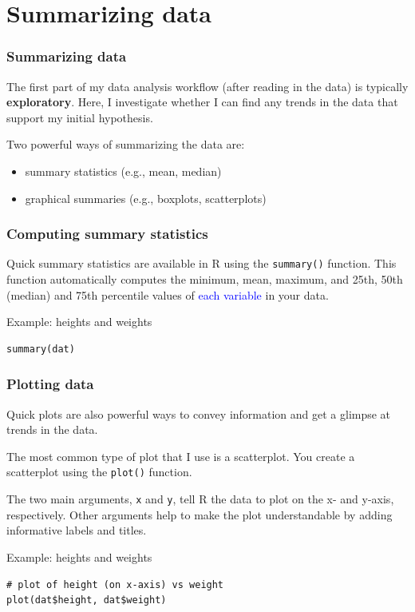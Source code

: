 \documentclass[11pt,dvipsnames]{beamer}
\begin{document}
\section{Summarizing data}
\begin{frame}
\frametitle{Summarizing data}
The first part of my data analysis workflow (after reading in the data) is typically \textbf{exploratory}. Here, I investigate whether I can find any trends in the data that support my initial hypothesis. \pause

Two powerful ways of summarizing the data are:\vspace{-0.3cm} \pause 
\begin{itemize}
\item summary statistics (e.g., mean, median) \pause
\item graphical summaries (e.g., boxplots, scatterplots)
\end{itemize}
\end{frame}


\begin{frame}[fragile]
\frametitle{Computing summary statistics}
Quick summary statistics are available in R using the \texttt{summary()} function. This function automatically computes the minimum, mean, maximum, and 25th, 50th (median) and 75th percentile values of \textcolor{blue}{each variable} in your data.

Example: heights and weights
\begin{verbatim}
summary(dat)
\end{verbatim}
\end{frame}

\begin{frame}[fragile]
\frametitle{Plotting data}
Quick plots are also powerful ways to convey information and get a glimpse at trends in the data.

The most common type of plot that I use is a scatterplot. You create a scatterplot using the \texttt{plot()} function. \pause

The two main arguments, \texttt{x} and \texttt{y}, tell R the data to plot on the x- and y-axis, respectively. Other arguments help to make the plot understandable by adding informative labels and titles.

Example: heights and weights
\begin{verbatim}
# plot of height (on x-axis) vs weight
plot(dat$height, dat$weight)
\end{verbatim}
\end{frame}
\end{document}
